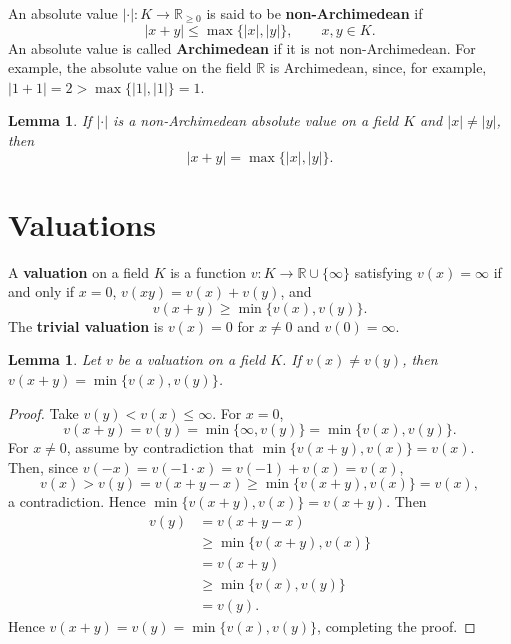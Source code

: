 \documentclass{article}
\newtheorem{lemma}[theorem]{Lemma}
\theoremstyle{definition}
\begin{document}
An absolute value $|\cdot|:K \to  \mathbb{R}_{\geq 0}$ is said to be \textbf{non-Archimedean} if
\[
|x+y| \leq \max\{|x|,|y|\}, \qquad x,y \in K.
\]
An absolute value is called \textbf{Archimedean} if it is not non-Archimedean. For example, the absolute value on the field
$\mathbb{R}$ is Archimedean, since, for example, $|1+1|=2>\max\{|1|,|1|\}=1$. 

\begin{lemma}
If $|\cdot|$ is a non-Archimedean absolute value on a field $K$ and $|x| \neq |y|$, then
\[
|x+y| = \max\{|x|,|y|\}.
\]
\end{lemma}





\section{Valuations}
A \textbf{valuation} on a field $K$ is a function $v:K \to \mathbb{R} \cup \{\infty\}$
satisfying $v(x)=\infty$ if and only if $x=0$, $v(xy)=v(x)+v(y)$, and
\[
v(x+y) \geq \min\{v(x),v(y)\}.
\]
The \textbf{trivial valuation} is $v(x)=0$ for $x \neq 0$ and $v(0)=\infty$. 

\begin{lemma}
Let $v$ be a valuation on a field $K$. If $v(x) \neq v(y)$, then $v(x+y)=\min\{v(x),v(y)\}$.
\end{lemma}
\begin{proof}
Take $v(y)<v(x) \leq \infty$. For $x=0$,
\[
v(x+y)=v(y)=\min\{\infty,v(y)\} = \min\{v(x),v(y)\}.
\]
For $x \neq 0$, assume by contradiction that $\min\{v(x+y),v(x)\}=v(x)$. Then, since $v(-x)=v(-1\cdot x)=v(-1)+ v(x)=v(x)$,
\[
v(x)>v(y)
=v(x+y-x)
\geq \min\{v(x+y),v(x)\}
=v(x),
\]
a contradiction. Hence $\min\{v(x+y),v(x)\}=v(x+y)$. Then
\begin{align*}
v(y)&=v(x+y-x)\\
&\geq \min\{v(x+y),v(x)\}\\
&=v(x+y)\\
&\geq \min\{v(x),v(y)\}\\
&=v(y).
\end{align*}
Hence $v(x+y)=v(y)=  \min\{v(x),v(y)\}$, completing the proof.
\end{proof}
\end{document}
